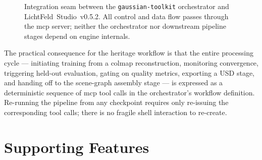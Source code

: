 \begin{figure}[htbp]
  \centering
  \caption{Integration seam between the \texttt{gaussian-toolkit} orchestrator and
           LichtFeld~Studio~v0.5.2. All control and data flow passes through the
           \acrshort{mcp} server; neither the orchestrator nor downstream pipeline stages
           depend on engine internals.}
  \label{fig:mcp-seam}
\end{figure}

The practical consequence for the heritage workflow is that the entire processing cycle —
initiating training from a \acrshort{colmap} reconstruction, monitoring convergence, triggering
held-out evaluation, gating on quality metrics, exporting a USD stage, and handing off to the
scene-graph assembly stage — is expressed as a deterministic sequence of \acrshort{mcp} tool
calls in the orchestrator's workflow definition.
Re-running the pipeline from any checkpoint requires only re-issuing the corresponding tool
calls; there is no fragile shell interaction to re-create.

\section{Supporting Features}
\label{sec:lf-supporting}

